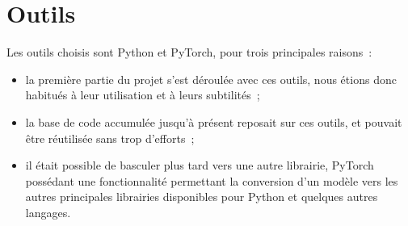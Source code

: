 \section{Outils}
Les outils choisis sont Python et PyTorch, pour trois principales raisons~:
\begin{itemize}
	\item la première partie du projet s'est déroulée avec ces outils, nous étions donc habitués à leur utilisation et à leurs subtilités~;
	\item la base de code accumulée jusqu'à présent reposait sur ces outils, et pouvait être réutilisée sans trop d'efforts~;
	\item il était possible de basculer plus tard vers une autre librairie, PyTorch possédant une fonctionnalité permettant la conversion d'un modèle vers les autres principales librairies disponibles pour Python et quelques autres langages.
\end{itemize}